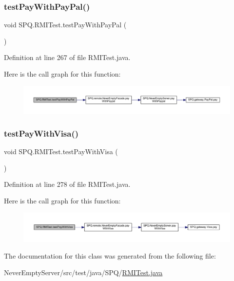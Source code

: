 \subsubsection{\texorpdfstring{test\+Pay\+With\+Pay\+Pal()}{testPayWithPayPal()}}
{\footnotesize\ttfamily void S\+P\+Q.\+R\+M\+I\+Test.\+test\+Pay\+With\+Pay\+Pal (\begin{DoxyParamCaption}{ }\end{DoxyParamCaption})}



Definition at line 267 of file R\+M\+I\+Test.\+java.

Here is the call graph for this function\+:\nopagebreak
\begin{figure}[H]
\begin{center}
\leavevmode
\includegraphics[width=350pt]{class_s_p_q_1_1_r_m_i_test_a15a72e3572c99f10ba0ac5b0368f1a02_cgraph}
\end{center}
\end{figure}
\mbox{\label{class_s_p_q_1_1_r_m_i_test_afc93d812f0763a7bd63583e6a573f024}} 
\subsubsection{\texorpdfstring{test\+Pay\+With\+Visa()}{testPayWithVisa()}}
{\footnotesize\ttfamily void S\+P\+Q.\+R\+M\+I\+Test.\+test\+Pay\+With\+Visa (\begin{DoxyParamCaption}{ }\end{DoxyParamCaption})}



Definition at line 278 of file R\+M\+I\+Test.\+java.

Here is the call graph for this function\+:\nopagebreak
\begin{figure}[H]
\begin{center}
\leavevmode
\includegraphics[width=350pt]{class_s_p_q_1_1_r_m_i_test_afc93d812f0763a7bd63583e6a573f024_cgraph}
\end{center}
\end{figure}


The documentation for this class was generated from the following file\+:\begin{DoxyCompactItemize}
\item 
Never\+Empty\+Server/src/test/java/\+S\+P\+Q/\mbox{\hyperlink{_r_m_i_test_8java}{R\+M\+I\+Test.\+java}}\end{DoxyCompactItemize}
